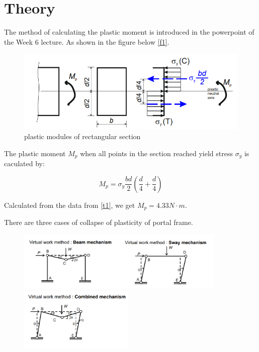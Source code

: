 \section{Theory}
\FloatBarrier %

The method of calculating the plastic moment is introduced in the powerpoint of the Week 6 lecture. As shown in the figure below \autoref{f1}.

\begin{figure}
    \centering
    \includegraphics[]{./fig/11.png}
    \caption{plastic modules of rectangular section  }
    \label{f1}
\end{figure}

The plastic moment $M_p$ when all points in the section reached
yield stress $\sigma_y$ is caculated by:

\begin{equation} 
    M_p=\sigma_y\frac{bd}{2}(\frac{d}{4}+\frac{d}{4})
\end{equation}

Calculated from the data from \autoref{t1}, we get $M_p=4.33N \cdot m$.

There are three cases of collapse of plasticity of portal frame.

\begin{figure}[htbp]
    \centering
    \includegraphics[width=10cm]{./fig/12.png}
    \includegraphics[width=5.5cm]{./fig/13.png}
    \label{f2}
\end{figure}

